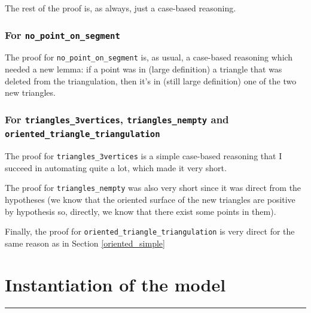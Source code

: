 \documentclass[a4paper,10pt]{article}
\begin{document}
The rest of the proof is, as always, just a case-based reasoning.

\subsubsection{For {\tt no\_point\_on\_segment}}
The proof for {\tt no\_point\_on\_segment} is, as usual, a case-based reasoning which needed a new lemma: if a point was in (large definition) a triangle that was deleted from the triangulation, then it's in (still large definition) one of the two new triangles.

\subsubsection{For {\tt triangles\_3vertices}, {\tt triangles\_nempty} and {\tt oriented\_triangle\_triangulation}}
The proof for {\tt triangles\_3vertices} is a simple case-based reasoning that I succeed in automating quite a lot, which made it very short.

The proof for {\tt triangles\_nempty} was also very short since it was direct from the hypotheses (we know that the oriented surface of the new triangles are positive by hypothesis so, directly, we know that there exist some points in them).

Finally, the proof for {\tt oriented\_triangle\_triangulation} is very direct for the same reason as in Section \ref{oriented_simple}

\section{Instantiation of the model}
\rule{\linewidth}{0.5pt}
\end{document}
